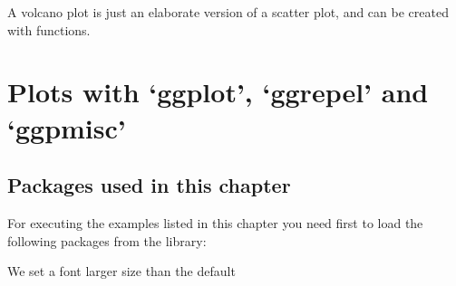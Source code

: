 \documentclass[paper=a4,10pt,div=17,headsepline,BCOR=12mm,twoside,open=right]{scrbook}\usepackage{knitr}
\begin{document}
A volcano plot is just an elaborate version of a scatter plot, and can be created with \ggplot functions.



\begin{knitrout}\footnotesize
{}\color{fgcolor}\begin{kframe}
\begin{alltt}
\hlstd{(}\hlopt{:}
\end{alltt}
\end{kframe}
\end{knitrout}






\chapter[Plots with ggpplot, ggrepel and ggpmisc]{Plots with `ggplot', `ggrepel' and `ggpmisc'}\label{chap:R:plotting}

\section{Packages used in this chapter}

For executing the examples listed in this chapter you need first to load the following packages from the library:

\begin{knitrout}\footnotesize
{}\color{fgcolor}\begin{kframe}
\begin{alltt}
\end{alltt}
\end{kframe}
\end{knitrout}

We set a font larger size than the default
\begin{knitrout}\footnotesize
{}\color{fgcolor}\begin{kframe}
\begin{alltt}
\hlstd{(}\hlstd{(}\hlstd{))}
\end{alltt}
\end{kframe}
\end{knitrout}
\end{document}
